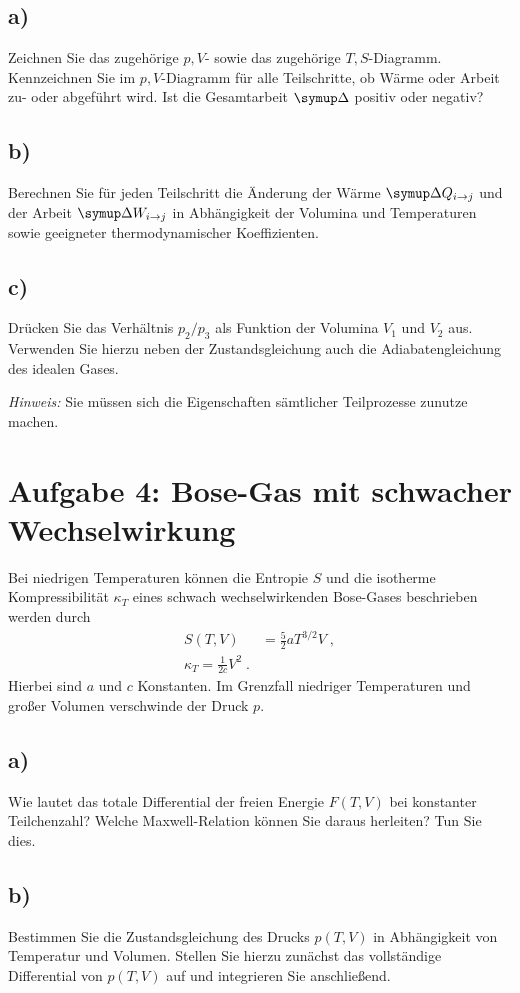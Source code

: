 \subsection{a)}
Zeichnen Sie das zugehörige $p,V$- sowie das zugehörige $T,S$-Diagramm.
Kennzeichnen Sie im $p,V$-Diagramm für alle Teilschritte, ob Wärme oder Arbeit zu- oder abgeführt wird.
Ist die Gesamtarbeit $\symup\Delta$ positiv oder negativ?

\subsection{b)}
Berechnen Sie für jeden Teilschritt die Änderung der Wärme $\symup\Delta Q_{i \to j}$ und der Arbeit $\symup\Delta W_{i \to j}$ in Abhängigkeit der Volumina und Temperaturen sowie geeigneter thermodynamischer Koeffizienten.

\subsection{c)}
Drücken Sie das Verhältnis $p_2 / p_3$ als Funktion der Volumina $V_1$ und $V_2$ aus.
Verwenden Sie hierzu neben der Zustandsgleichung auch die Adiabatengleichung des idealen Gases.

\textit{Hinweis:} Sie müssen sich die Eigenschaften sämtlicher Teilprozesse zunutze machen.

\section{Aufgabe 4: Bose-Gas mit schwacher Wechselwirkung}
Bei niedrigen Temperaturen können die Entropie $S$ und die isotherme Kompressibilität $\kappa_T$ eines schwach wechselwirkenden Bose-Gases beschrieben werden durch
\begin{align}
    S(T,V) &= \frac{5}{2}aT^{3/2}V \;, \\
    \kappa_T = \frac{1}{2c}V^2 \;.
\end{align}
Hierbei sind $a$ und $c$ Konstanten. Im Grenzfall niedriger Temperaturen und großer Volumen verschwinde der Druck $p$.

\subsection{a)}
Wie lautet das totale Differential der freien Energie $F(T,V)$ bei konstanter Teilchenzahl?
Welche Maxwell-Relation können Sie daraus herleiten?
Tun Sie dies.

\subsection{b)}
Bestimmen Sie die Zustandsgleichung des Drucks $p(T,V)$ in Abhängigkeit von Temperatur und Volumen.
Stellen Sie hierzu zunächst das vollständige Differential von $p(T,V)$ auf und integrieren Sie anschließend.

